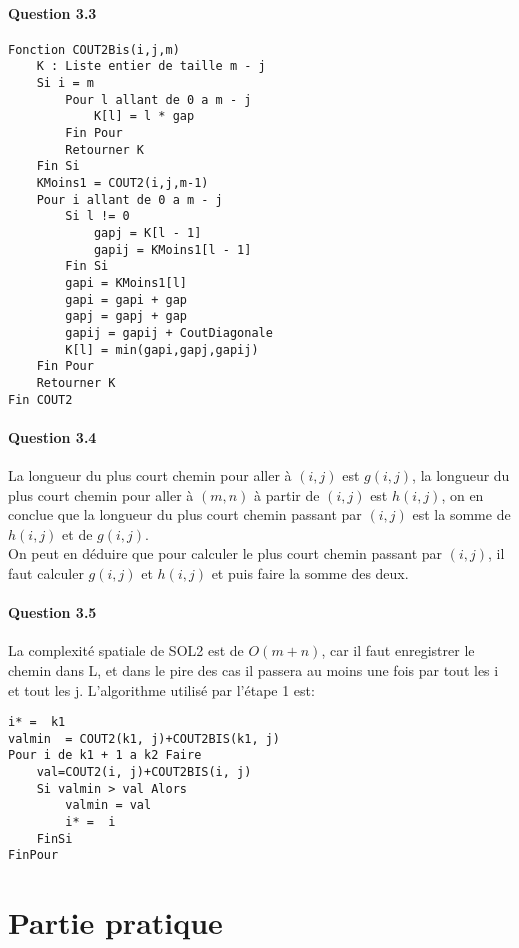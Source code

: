 \documentclass[5pt,a4paper]{report}
\begin{document}
	\subsection*{Question 3.3}
	\begin{lstlisting}
Fonction COUT2Bis(i,j,m)
	K : Liste entier de taille m - j
	Si i = m
		Pour l allant de 0 a m - j
			K[l] = l * gap
		Fin Pour
		Retourner K
	Fin Si
	KMoins1 = COUT2(i,j,m-1)
	Pour i allant de 0 a m - j
		Si l != 0
			gapj = K[l - 1]
			gapij = KMoins1[l - 1]
		Fin Si
		gapi = KMoins1[l]
		gapi = gapi + gap
		gapj = gapj + gap
		gapij = gapij + CoutDiagonale
		K[l] = min(gapi,gapj,gapij)
	Fin Pour
	Retourner K
Fin COUT2
	\end{lstlisting}
	
	\subsection*{Question 3.4}
	La longueur du plus court chemin pour aller à $(i,j)$ est $g(i,j)$, la longueur du plus court chemin pour aller à $(m,n)$ à partir de $(i,j)$ est $h(i,j)$, on en conclue que la longueur du plus court chemin passant par $(i,j)$ est la somme de $h(i,j)$ et de $g(i,j)$.\\
	On peut en déduire que pour calculer le plus court chemin passant par $(i,j)$, il faut calculer $g(i,j)$ et $h(i,j)$ et puis faire la somme des deux.
	
	\subsection*{Question 3.5}
	La complexité spatiale de SOL2 est de $O(m+n)$, car il faut enregistrer le chemin dans L, et dans le pire des cas il passera au moins une fois par tout les i et tout les j.
	L'algorithme utilisé par l'étape 1 est:
	\begin{lstlisting}
i* =  k1
valmin  = COUT2(k1, j)+COUT2BIS(k1, j)
Pour i de k1 + 1 a k2 Faire
	val=COUT2(i, j)+COUT2BIS(i, j)
	Si valmin > val Alors
		valmin = val
		i* =  i
	FinSi
FinPour
	\end{lstlisting}
\part{Partie pratique}
\end{document}
